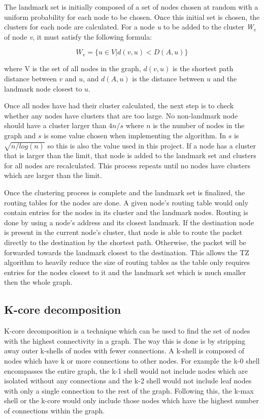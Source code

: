 \documentclass{mpaper}
\begin{document}
The landmark set is initially composed of a set of nodes chosen at random with a uniform probability for each node to be chosen. Once this initial set is chosen, the clusters for each node are calculated. For a node \textit{u} to be added to the cluster \textit{W$_v$} of node \textit{v}, it must satisfy the following formula:

\[W_v = \{u \in V | d(v,u) < D(A,u)\}\]

where V is the set of all nodes in the graph, $d(v,u)$ is the shortest path distance between $v$ and $u$, and $d(A,u)$ is the distance between $u$ and the landmark node closest to $u$.

Once all nodes have had their cluster calculated, the next step is to check whether any nodes have clusters that are too large. No non-landmark node should have a cluster larger than $4n/s$ where $n$ is the number of nodes in the graph and $s$ is some value chosen when implementing the algorithm. In \cite{thorup} $s$ is $\sqrt{n/log(n)}$ so this is also the value used in this project. If a node has a cluster that is larger than the limit, that node is added to the landmark set and clusters for all nodes are recalculated. This process repeats until no nodes have clusters which are larger than the limit. 

Once the clustering process is complete and the landmark set is finalized, the routing tables for the nodes are done. A given node's routing table would only contain entries for the nodes in its cluster and the landmark nodes. Routing is done by using a node's address and its closest landmark. If the destination node is present in the current node's cluster, that node is able to route the packet directly to the destination by the shortest path. Otherwise, the packet will be forwarded towards the landmark closest to the destination. This allows the TZ algorithm to heavily reduce the size of routing tables as the table only requires entries for the nodes closest to it and the landmark set which is much smaller then the whole graph.
 
\subsection{K-core decomposition}

K-core decomposition is a technique which can be used to find the set of nodes with the highest connectivity in a graph. The way this is done is by stripping away outer k-shells of nodes with fewer connections. A k-shell is composed of nodes which have k or more connections to other nodes. For example the k-0 shell encompasses the entire graph, the k-1 shell would not include nodes which are isolated without any connections and the k-2 shell would not include leaf nodes with only a single connection to the rest of the graph. Following this, the k-max shell or the k-core would only include those nodes which have the highest number of connections within the graph.
\end{document}

